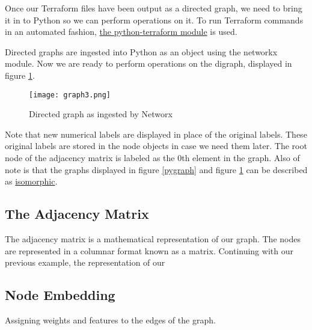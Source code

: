\justifying
Once our Terraform files have been output as a directed graph, we need to bring it in to Python so we can
perform operations on it. To run Terraform commands in an automated fashion, \href{https://pypi.org/project/python-terraform/}{the python-terraform module}
is used.

\justifying
Directed graphs are ingested into Python as an object using the networkx module. Now we are ready to
perform operations on the digraph, displayed in figure \ref{digraph}.

\justifying
\begin{figure}[H]
    \texttt{[image: graph3.png]}
    \caption{Directed graph as ingested by Networx}
    \label{digraph}
\end{figure}

\justifying
Note that new numerical labels are displayed in place of the original labels. These original labels are
stored in the node objects in case we need them later. The root node of the adjacency matrix is labeled
as the 0th element in the graph. Also of note is that the graphs displayed in figure \ref{pygraph} and figure \ref{digraph} can be described as \href{https://en.wikipedia.org/wiki/Graph\_isomorphism}{isomorphic}.

\subsection{\label{sec:adjacency}The Adjacency Matrix}

The adjacency matrix is a mathematical representation of our graph. The nodes are represented in a
columnar format known as a matrix. Continuing with our previous example, the representation of our

\subsection{\label{sec:embedding}Node Embedding}

Assigning weights and features to the edges of the graph.




\clearpage
\begin{versionhistory}
\end{versionhistory}
\nocite{*}




